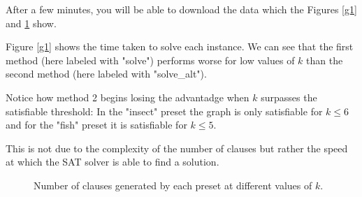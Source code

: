 \documentclass[table]{article}
\begin{document}
After a few minutes, you will be able to download the data which the Figures \ref{g1} and \ref{g2} show.

Figure \ref{g1} shows the time taken to solve each instance. 
We can see that the first method (here labeled with "solve") 
performs worse for low values of $k$ than the second method (here labeled with "solve\_alt").

Notice how method 2 begins losing the advantadge when $k$ surpasses the satisfiable threshold: In the "insect" preset the graph is only satisfiable for $k\leq 6$ and for the "fish" preset it is satisfiable for $k\leq 5$.

This is not due to the complexity of the number of clauses but rather the speed at which the SAT solver is able to find a solution.
\begin{figure}[h]
    \centering
    \begin{subfigure}{0.49\linewidth}
    \end{subfigure}
    \begin{subfigure}{0.49\linewidth}
    \end{subfigure}
    \caption{Number of clauses generated by each preset at different values of $k$.}\label{g2}
\end{figure}
\end{document}
